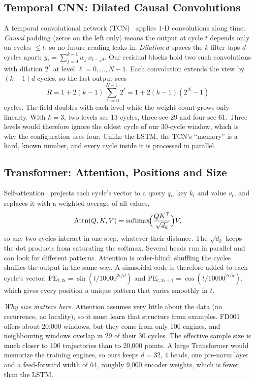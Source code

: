 \subsection{Temporal CNN: Dilated Causal Convolutions}
A temporal convolutional network (TCN)~\cite{Bai2018empirical} applies 1-D
convolutions along time. \emph{Causal} padding (zeros on the left only)
means the output at cycle $t$ depends only on cycles $\leq t$, so no future
reading leaks in. \emph{Dilation} $d$ spaces the $k$ filter taps $d$ cycles
apart: $y_t=\sum_{j=0}^{k-1}w_j\,x_{t-jd}$. Our residual blocks hold two such
convolutions with dilation $2^{\ell}$ at level $\ell=0,\dots,N-1$. Each
convolution extends the view by $(k-1)d$ cycles, so the last output sees
\begin{equation}
R = 1 + 2(k-1)\sum_{\ell=0}^{N-1}2^{\ell} = 1+2(k-1)(2^{N}-1)
\end{equation}
cycles. The field doubles with each level while the weight count grows only
linearly. With $k=3$, two levels see 13 cycles, three see 29 and four see 61.
Three levels would therefore ignore the oldest cycle of our 30-cycle window,
which is why the configuration uses four. Unlike the LSTM, the TCN's
``memory'' is a hard, known number, and every cycle inside it is processed in
parallel.

\subsection{Transformer: Attention, Positions and Size}
Self-attention~\cite{Vaswani2017attention} projects each cycle's vector to a
query $q_t$, key $k_t$ and value $v_t$, and replaces it with a weighted
average of all values,
\begin{equation}
\operatorname{Attn}(Q,K,V)=\operatorname{softmax}\!\Bigl(\frac{QK^\top}{\sqrt{d_k}}\Bigr)V ,
\end{equation}
so any two cycles interact in one step, whatever their distance. The
$\sqrt{d_k}$ keeps the dot products from saturating the softmax. Several
heads run in parallel and can look for different patterns. Attention is
order-blind: shuffling the cycles shuffles the output in the same way. A
sinusoidal code is therefore added to each cycle's vector,
$\mathrm{PE}_{t,2i}=\sin(t/10000^{2i/d})$ and
$\mathrm{PE}_{t,2i+1}=\cos(t/10000^{2i/d})$, which gives every position a
unique pattern that varies smoothly in $t$.

\emph{Why size matters here.} Attention assumes very little about the data
(no recurrence, no locality), so it must learn that structure from
examples. FD001 offers about 20,000 windows, but they come from only 100
engines, and neighbouring windows overlap in 29 of their 30 cycles. The
effective sample size is much closer to 100 trajectories than to 20,000
points. A large Transformer would memorize the training engines, so ours
keeps $d=32$, 4 heads, one pre-norm layer and a feed-forward width of 64,
roughly 9,000 encoder weights, which is fewer than the LSTM.

